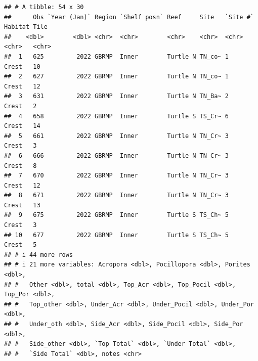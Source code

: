 \documentclass[
]{article}
\begin{document}
\begin{verbatim}
## # A tibble: 54 x 30
##      Obs `Year (Jan)` Region `Shelf posn` Reef     Site   `Site #` Habitat Tile 
##    <dbl>        <dbl> <chr>  <chr>        <chr>    <chr>  <chr>    <chr>   <chr>
##  1   625         2022 GBRMP  Inner        Turtle N TN_co~ 1        Crest   10   
##  2   627         2022 GBRMP  Inner        Turtle N TN_co~ 1        Crest   12   
##  3   631         2022 GBRMP  Inner        Turtle N TN_Ba~ 2        Crest   2    
##  4   658         2022 GBRMP  Inner        Turtle S TS_Cr~ 6        Crest   14   
##  5   661         2022 GBRMP  Inner        Turtle N TN_Cr~ 3        Crest   3    
##  6   666         2022 GBRMP  Inner        Turtle N TN_Cr~ 3        Crest   8    
##  7   670         2022 GBRMP  Inner        Turtle N TN_Cr~ 3        Crest   12   
##  8   671         2022 GBRMP  Inner        Turtle N TN_Cr~ 3        Crest   13   
##  9   675         2022 GBRMP  Inner        Turtle S TS_Ch~ 5        Crest   3    
## 10   677         2022 GBRMP  Inner        Turtle S TS_Ch~ 5        Crest   5    
## # i 44 more rows
## # i 21 more variables: Acropora <dbl>, Pocillopora <dbl>, Porites <dbl>,
## #   Other <dbl>, total <dbl>, Top_Acr <dbl>, Top_Pocil <dbl>, Top_Por <dbl>,
## #   Top_other <dbl>, Under_Acr <dbl>, Under_Pocil <dbl>, Under_Por <dbl>,
## #   Under_oth <dbl>, Side_Acr <dbl>, Side_Pocil <dbl>, Side_Por <dbl>,
## #   Side_other <dbl>, `Top Total` <dbl>, `Under Total` <dbl>,
## #   `Side Total` <dbl>, notes <chr>
\end{verbatim}
\end{document}
